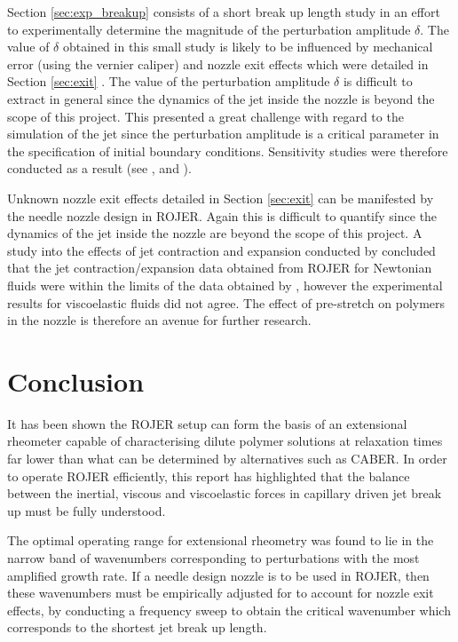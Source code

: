 \documentclass[11pt]{article}
\begin{document}
Section \ref{sec:exp_breakup} consists of a short break up length study in an effort to experimentally determine the magnitude of the perturbation amplitude $\delta$. The value of $\delta$ obtained in this small study is likely to be influenced by mechanical error (using the vernier caliper) and nozzle exit effects which were detailed in Section \ref{sec:exit} . The value of the perturbation amplitude $\delta$ is difficult to extract in general since the dynamics of the jet inside the nozzle is beyond the scope of this project. This presented a great challenge with regard to the simulation of the jet since the perturbation amplitude is a critical parameter in the specification of initial boundary conditions. Sensitivity studies were therefore conducted as a result (see \cite{gorbatenko2015report}, \cite{greiciunas2015report} and \cite{hall2015report}).

Unknown nozzle exit effects detailed in Section \ref{sec:exit} can  be manifested by the needle nozzle design in ROJER. Again this is difficult to quantify since the dynamics of the jet inside the nozzle are beyond the scope of this project. A study into the effects of jet contraction and expansion conducted by \cite{greiciunas2015report} concluded that the jet contraction/expansion data obtained from ROJER for Newtonian fluids were within the limits of the data obtained by \cite{middleman1961expansion}, however the experimental results for viscoelastic fluids did not agree. The effect of pre-stretch on polymers in the nozzle is therefore an avenue for further research. 

\newpage

\section{Conclusion}

It has been shown the ROJER setup can form the basis of an extensional rheometer capable of characterising dilute polymer solutions at relaxation times far lower than what can be determined by alternatives such as CABER. In order to operate ROJER efficiently, this report has highlighted that the balance between the inertial, viscous and viscoelastic forces in capillary driven jet break up must be fully understood.

The optimal operating range for extensional rheometry was found to lie in the narrow band of wavenumbers corresponding to perturbations with the most amplified growth rate. If a needle design nozzle is to be used in ROJER, then these wavenumbers must be empirically adjusted for to account for nozzle exit effects, by conducting a frequency sweep to obtain the critical wavenumber which corresponds to the shortest jet break up length.
\end{document}
